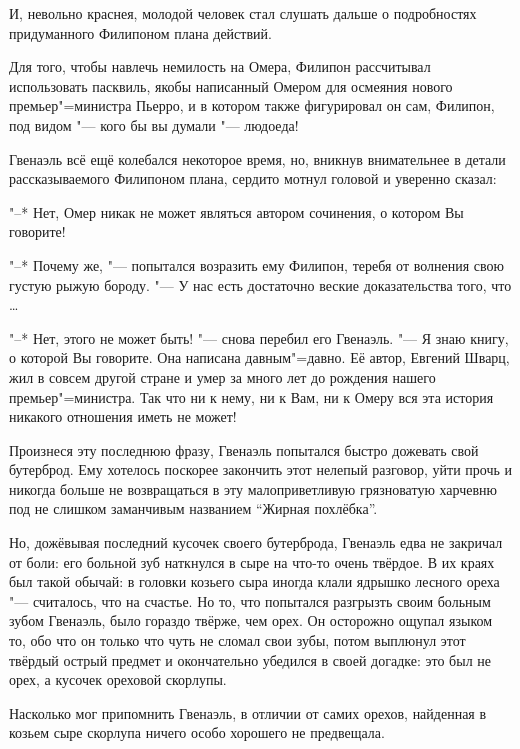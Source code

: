 И, невольно краснея, молодой человек стал слушать дальше о подробностях
придуманного Филипоном плана действий.

Для того, чтобы навлечь немилость на Омера, Филипон рассчитывал использовать
пасквиль, якобы написанный Омером для осмеяния нового премьер"=министра Пьерро,
и в котором также фигурировал он сам, Филипон, под видом "--- кого бы вы думали
"--- людоеда!

Гвенаэль всё ещё колебался некоторое время, но, вникнув внимательнее в детали
рассказываемого Филипоном плана, сердито мотнул головой и уверенно сказал:

"--* Нет, Омер никак не может являться автором сочинения, о котором Вы говорите!

"--* Почему же, "--- попытался возразить ему Филипон, теребя от волнения свою
густую рыжую бороду.
"--- У нас есть достаточно веские доказательства того, что \ldots

"--* Нет, этого не может быть! "--- снова перебил его Гвенаэль.
"--- Я знаю книгу, о которой Вы говорите.
Она написана давным"=давно.
Её автор, Евгений Шварц, жил в совсем другой стране и умер за много лет до
рождения нашего премьер"=министра.
Так что ни к нему, ни к Вам, ни к Омеру вся эта история никакого отношения иметь
не может!

Произнеся эту последнюю фразу, Гвенаэль попытался быстро дожевать свой бутерброд.
Ему хотелось поскорее закончить этот нелепый разговор, уйти прочь и никогда
больше не возвращаться в эту малоприветливую грязноватую харчевню под не слишком
заманчивым названием \enquote{Жирная похлёбка}.

Но, дожёвывая последний кусочек своего бутерброда, Гвенаэль едва не закричал от
боли: его больной зуб наткнулся в сыре на что-то очень твёрдое.
В их краях был такой обычай: в головки козьего сыра иногда клали ядрышко лесного
ореха "--- считалось, что на счастье.
Но то, что попытался разгрызть своим больным зубом Гвенаэль, было гораздо
твёрже, чем орех.
Он осторожно ощупал языком то, обо что он только что чуть не сломал свои зубы,
потом выплюнул этот твёрдый острый предмет и окончательно убедился в своей
догадке: это был не орех, а кусочек ореховой скорлупы.

Насколько мог припомнить Гвенаэль, в отличии от самих орехов, найденная в козьем
сыре скорлупа ничего особо хорошего не предвещала.
